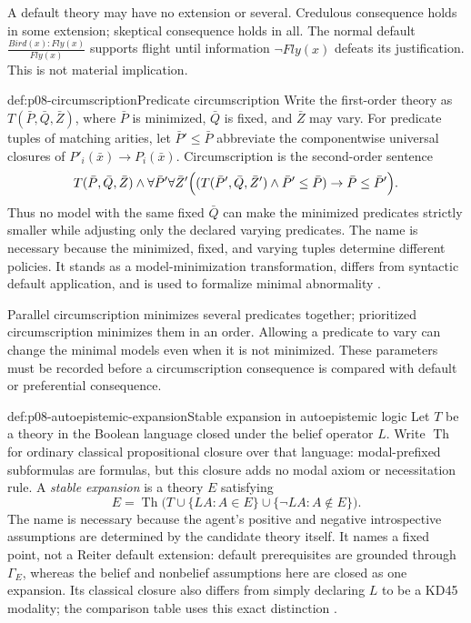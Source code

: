 A default theory may have no extension or several. Credulous consequence holds
in some extension; skeptical consequence holds in all. The normal default
\(\frac{Bird(x):Fly(x)}{Fly(x)}\) supports flight until information
\(\neg Fly(x)\) defeats its justification. This is not material implication.

\begin{hbdefinition}{def:p08-circumscription}{Predicate circumscription}
Write the first-order theory as \(T(\bar P,\bar Q,\bar Z)\), where \(\bar P\)
is minimized, \(\bar Q\) is fixed, and \(\bar Z\) may vary.  For predicate
tuples of matching arities, let \(\bar P'\leq\bar P\) abbreviate the
componentwise universal closures of \(P'_i(\bar x)\to P_i(\bar x)\).
Circumscription is the second-order sentence
\[
 T(\bar P,\bar Q,\bar Z)\land
 \forall\bar P'\forall\bar Z'
 \Bigl((T(\bar P',\bar Q,\bar Z')\land\bar P'\leq\bar P)
       \to\bar P\leq\bar P'\Bigr).
\]
Thus no model with the same fixed \(\bar Q\) can make the minimized predicates
strictly smaller while adjusting only the declared varying predicates.  The
name is necessary because the minimized, fixed, and varying tuples determine
different policies.  It stands as a model-minimization transformation,
differs from syntactic default application, and is used to formalize minimal
abnormality \cite{McCarthy1980}.
\end{hbdefinition}

Parallel circumscription minimizes several predicates together; prioritized
circumscription minimizes them in an order. Allowing a predicate to vary can
change the minimal models even when it is not minimized. These parameters must
be recorded before a circumscription consequence is compared with default or
preferential consequence.

\begin{hbdefinition}{def:p08-autoepistemic-expansion}{Stable expansion in autoepistemic logic}
Let \(T\) be a theory in the Boolean language closed under the belief operator
\(L\).  Write \(\operatorname{Th}\) for ordinary classical propositional
closure over that language: modal-prefixed subformulas are formulas, but this
closure adds no modal axiom or necessitation rule.  A \emph{stable expansion}
is a theory \(E\) satisfying
\[
 E=\operatorname{Th}
 \bigl(T\cup\{LA:A\in E\}\cup\{\neg LA:A\notin E\}\bigr).
\]
The name is necessary because the agent's positive and negative introspective
assumptions are determined by the candidate theory itself.  It names a fixed
point, not a Reiter default extension: default prerequisites are grounded
through \(\Gamma_E\), whereas the belief and nonbelief assumptions here are
closed as one expansion.  Its classical closure also differs from simply
declaring \(L\) to be a KD45 modality; the comparison table uses this exact
distinction \cite{Moore1985}.
\end{hbdefinition}


